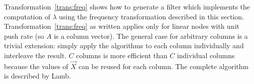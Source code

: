 Transformation~\ref{trans:freq} shows how to generate a 
filter which implements the computation of $\lambda$ using the
frequency transformation described in this section. 
Transformation~\ref{trans:freq} as written applies only for
linear nodes with unit push rate (so $A$ is a column vector).
The general case for arbitrary columns is a trivial extension:
simply apply the algorithms to each column individually and interleave
the result. $C$ columns is more efficient than $C$ individual columns
because the values of $\vec{X}$ can 
be reused for each column. The complete algorithm is described by 
Lamb\cite{lamb-thesis}. 




